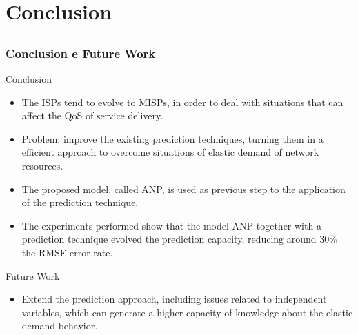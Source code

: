 \documentclass[aspectratio=169]{beamer}
\begin{document}



\section{Conclusion}


\subsection{}
\begin{frame}
\frametitle{Conclusion e Future Work}
\small
\begin{block}{Conclusion}
\begin{itemize} \small
\item The ISPs tend to evolve to MISPs, in order to deal with situations that can affect the QoS of service delivery.
\item Problem: improve the existing prediction techniques, turning them in a efficient approach to overcome situations of elastic demand of network resources.
\item The proposed model, called ANP, is used as previous step to the application of the prediction technique.
\item The experiments performed show that the model ANP together with a prediction technique evolved the prediction capacity, reducing around 30\% the RMSE error rate.
\end{itemize}
\end{block}

\begin{block}{Future Work}
\begin{itemize} \small
\item Extend the prediction approach, including issues related to independent variables, which can generate a higher capacity of knowledge about the elastic demand behavior.
\end{itemize}
\end{block}

\end{frame}

\end{document}
